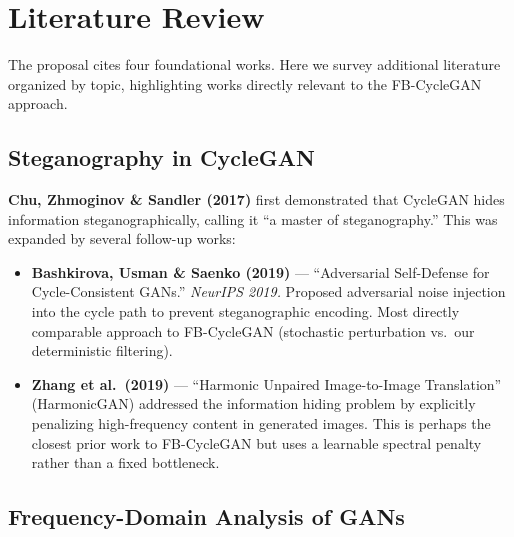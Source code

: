 \documentclass[11pt,a4paper]{article}
\theoremstyle{definition}
\begin{document}
\section{Literature Review}
\label{sec:litreview}

The proposal cites four foundational works. Here we survey additional literature organized by topic, highlighting works directly relevant to the FB-CycleGAN approach.

\subsection{Steganography in CycleGAN}

\textbf{Chu, Zhmoginov \& Sandler (2017)} first demonstrated that CycleGAN hides information steganographically, calling it ``a master of steganography.'' This was expanded by several follow-up works:

\begin{itemize}
    \item \textbf{Bashkirova, Usman \& Saenko (2019)} --- ``Adversarial Self-Defense for Cycle-Consistent GANs.'' \textit{NeurIPS 2019.} Proposed adversarial noise injection into the cycle path to prevent steganographic encoding. Most directly comparable approach to FB-CycleGAN (stochastic perturbation vs.\ our deterministic filtering).

    \item \textbf{Zhang et al.\ (2019)} --- ``Harmonic Unpaired Image-to-Image Translation'' (HarmonicGAN) addressed the information hiding problem by explicitly penalizing high-frequency content in generated images. This is perhaps the closest prior work to FB-CycleGAN but uses a learnable spectral penalty rather than a fixed bottleneck.
\end{itemize}

\subsection{Frequency-Domain Analysis of GANs}
\end{document}
